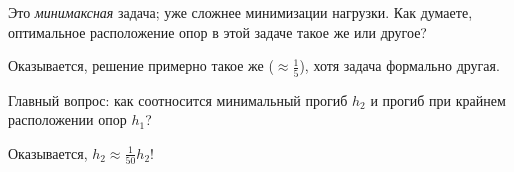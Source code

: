 \documentclass[main.tex]{subfiles}
\begin{document}
Это \emph{минимаксная} задача; уже сложнее минимизации нагрузки.
Как думаете, оптимальное расположение опор в этой задаче такое же или другое?

Оказывается, решение примерно такое же ($ \approx \frac{1}{5} $), хотя задача формально другая.

Главный вопрос: как соотносится минимальный прогиб $h_2$ и прогиб при крайнем расположении опор $ h_1 $?

Оказывается, $ h_2 \approx \frac{1}{50} h_2 $!
\end{document}
